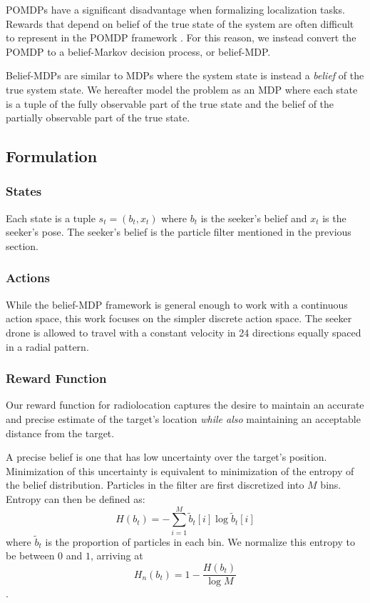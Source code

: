 \documentclass[10pt,twocolumn,letterpaper]{article}
\begin{document}
POMDPs have a significant disadvantage when formalizing localization tasks.
Rewards that depend on belief of the true state of the system are often difficult to represent in the POMDP framework \cite{dronehunter}.
For this reason, we instead convert the POMDP to a belief-Markov decision process, or belief-MDP.

Belief-MDPs are similar to MDPs where the system state is instead a \textit{belief} of the true system state.
We hereafter model the problem as an MDP where each state is a tuple of the fully observable part of the true state and the belief of the partially observable part of the true state.

\subsection{Formulation}

\subsubsection{States}
Each state is a tuple $s_t = (b_t, x_t)$ where $b_t$ is the seeker's belief and $x_t$ is the seeker's pose.
The seeker's belief is the particle filter mentioned in the previous section.

\subsubsection{Actions}
While the belief-MDP framework is general enough to work with a continuous action space, this work focuses on the simpler discrete action space.
The seeker drone is allowed to travel with a constant velocity in 24 directions equally spaced in a radial pattern.

\subsubsection{Reward Function}
Our reward function for radiolocation captures the desire to maintain an accurate and precise estimate of the target's location \textit{while also} maintaining an acceptable distance from the target.

A precise belief is one that has low uncertainty over the target's position.
Minimization of this uncertainty is equivalent to minimization of the entropy of the belief distribution.
Particles in the filter are first discretized into $M$ bins.
Entropy can then be defined as:
\begin{equation}
H(b_t) = -\sum_{i = 1}^M\tilde{b}_t[i]\log\tilde{b}_t[i]
\label{entropy_unnormalized}
\end{equation}
where $\tilde{b}_t$ is the proportion of particles in each bin.
We normalize this entropy to be between $0$ and $1$, arriving at
\begin{equation}
H_{n}(b_t) = 1 - \frac{H(b_t)}{\log{M}}
\label{entropy_normalized}
\end{equation}.
\end{document}
